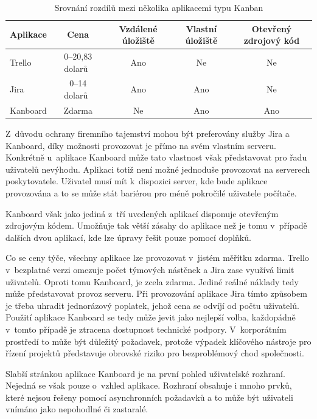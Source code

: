 \begin{table}[H]
\centering
\caption{Srovnání rozdílů mezi několika aplikacemi typu Kanban}
\label{tab:kanban-sum}
\begin{tabular}{ |l|c|c|c|c| } 
\hline
Aplikace & Cena\footnotemark & Vzdálené úložiště & Vlastní úložiště & Otevřený zdrojový kód  \\
\hline
Trello & 0--20,83 dolarů~\cite{bib:trello-pricing} & Ano & Ne & Ne \\ 
Jira & 0--14 dolarů~\cite{bib:jira-pricing} & Ano & Ano & Ne \\ 
Kanboard & Zdarma & Ne & Ano & Ano \\ 
\hline
\end{tabular}
\end{table}

Z~důvodu ochrany firemního tajemství mohou být preferovány služby Jira a Kanboard, díky možnosti provozovat je přímo na svém vlastním serveru. Konkrétně u~aplikace Kanboard může tato vlastnost však představovat pro řadu uživatelů nevýhodu. Aplikaci totiž není možné jednoduše provozovat na serverech poskytovatele. Uživatel musí mít k~dispozici server, kde bude aplikace provozována a to se může stát bariérou pro méně pokročilé uživatele počítače.

Kanboard však jako jediná z~tří uvedených aplikací disponuje otevřeným zdrojovým kódem. Umožňuje tak větší zásahy do aplikace než je tomu v~případě dalších dvou aplikací, kde lze úpravy řešit pouze pomocí doplňků.

Co se ceny týče, všechny aplikace lze provozovat v~jistém měřítku zdarma. Trello v~bezplatné verzi omezuje počet týmových nástěnek a Jira zase využívá limit uživatelů. Oproti tomu Kanboard, je zcela zdarma. Jediné reálné náklady tedy může představovat provoz serveru. Při provozování aplikace Jira tímto způsobem je třeba uhradit jednorázový poplatek, jehož cena se odvíjí od počtu uživatelů. Použití aplikace Kanboard se tedy může jevit jako nejlepší volba, každopádně v~tomto případě je ztracena dostupnost technické podpory. V~korporátním prostředí to může být důležitý požadavek, protože výpadek klíčového nástroje pro řízení projektů představuje obrovské riziko pro bezproblémový chod společnosti.

Slabší stránkou aplikace Kanboard je na první pohled uživatelské rozhraní. Nejedná se však pouze o~vzhled aplikace. Rozhraní obsahuje i mnoho prvků, které nejsou řešeny pomocí asynchronních požadavků a to může být uživateli vnímáno jako nepohodlné či zastaralé.

